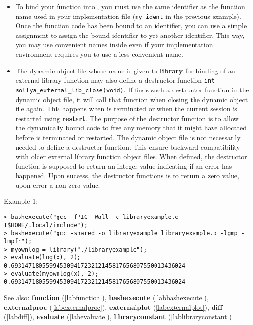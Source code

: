 \begin{itemize}
\item To bind your function into \sollya, you must use the same identifier as the
   function name used in your implementation file (\verb|my_ident| in the previous
   example). Once the function code has been bound to an identifier, you can use a simple assignment
   to assign the bound identifier to yet another identifier. This way, you may use convenient
   names inside \sollya even if your implementation environment requires you to use a less
   convenient name.

\item The dynamic object file whose name is given to \textbf{library} for binding of an
   external library function may also define a destructor function \verb|int sollya_external_lib_close(void)|.
   If \sollya finds such a destructor function in the dynamic object file, it will call 
   that function when closing the dynamic object file again. This happens when \sollya
   is terminated or when the current \sollya session is restarted using \textbf{restart}.
   The purpose of the destructor function is to allow the dynamically bound code
   to free any memory that it might have allocated before \sollya is terminated 
   or restarted. 
   The dynamic object file is not necessarily needed to define a destructor
   function. This ensure backward compatibility with older \sollya external 
   library function object files.
   When defined, the destructor function is supposed to return an integer
   value indicating if an error has happened. Upon success, the destructor
   functions is to return a zero value, upon error a non-zero value.
\end{itemize}
\noindent Example 1: 
\begin{center}\begin{minipage}{15cm}\begin{Verbatim}[frame=single]
> bashexecute("gcc -fPIC -Wall -c libraryexample.c -I$HOME/.local/include");
> bashexecute("gcc -shared -o libraryexample libraryexample.o -lgmp -lmpfr");
> myownlog = library("./libraryexample");
> evaluate(log(x), 2);
0.69314718055994530941723212145817656807550013436024
> evaluate(myownlog(x), 2);
0.69314718055994530941723212145817656807550013436024
\end{Verbatim}
\end{minipage}\end{center}
See also: \textbf{function} (\ref{labfunction}), \textbf{bashexecute} (\ref{labbashexecute}), \textbf{externalproc} (\ref{labexternalproc}), \textbf{externalplot} (\ref{labexternalplot}), \textbf{diff} (\ref{labdiff}), \textbf{evaluate} (\ref{labevaluate}), \textbf{libraryconstant} (\ref{lablibraryconstant})

